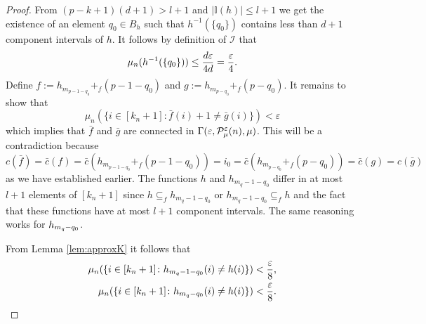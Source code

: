 \begin{proof}
  From $(p-k+1)(d+1) > l+1$ and $\left|\mathbb{I}(h)\right| \leq l+1$ we get the existence of an element $q_0 \in B_h$ such that $h^{-1}(\{q_0\})$ contains less than $d+1$ component intervals of $h$.
  It follows by definition of $\mathcal{I}$ that
  \begin{equation}\label{eq:hq0}
    \mu_n(h^{-1}(\{q_0\})) \leq {d \varepsilon \over 4d} = {\varepsilon \over 4}.
  \end{equation}
  Define $f:= h_{m_{p-1-q_0}} +_f (p-1-q_0)$ and $g:= h_{m_{p-q_0}}+_f (p-q_0)$. It remains to show that
  \begin{equation}\label{eq:cl}
    \mu_n(\{i \in [k_n+1]\colon \bar{f}(i) + 1\neq \bar{g}(i)\}) < \varepsilon
  \end{equation}
  which implies that $\bar{f}$ and $\bar{g}$ are connected in $\Gamma(\varepsilon, \P_\mu^\varepsilon(n), \mu)$. This will be a contradiction because \[c(\bar{f}) = \bar{c}(f) = \bar{c}(h_{m_{p-1-q_0}} +_f (p-1-q_0)) = i_0 = \bar{c}(h_{m_{p-q_0}}+_f (p-q_0)) = \bar{c}(g)= c(\bar{g})\] as we have established earlier.
  The functions $h$ and $h_{m_q-1-q_0}$ differ in at most $l+1$ elements of $[k_n+1]$ since $h \subseteq_f h_{m_q-1-q_0}$ or $h_{m_q-1-q_0} \subseteq_f h$ and the fact that these functions have at most $l+1$ component intervals.
  The same reasoning works for $\hh$.

  From Lemma \ref{lem:approxK} it follows that
  \begin{align}
    \label{eq:h1}\mu_n(\{i\in [k_n+1]\colon \h (i) \neq h(i)\}) < {\varepsilon \over 8}, \\
    \label{eq:h2}\mu_n(\{i\in [k_n+1]\colon \hh (i) \neq h(i)\}) < {\varepsilon \over 8}. 
  \end{align}


\end{proof}
